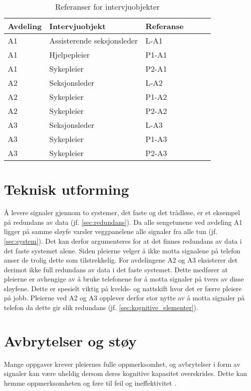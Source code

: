 \begin{table}[H]\centering
    \begin{tabular}{ |l|l|l|l|l|l| }
    \hline
    \textbf{Avdeling} & \textbf{Intervjuobjekt} & \textbf{Referanse} \\ \hline
       A1 & Assisterende seksjonsleder & L-A1 \\ \hline
       A1 & Hjelpepleier & P1-A1 \\ \hline
       A1 & Sykepleier & P2-A1 \\ \hline
       A2 & Seksjonsleder & L-A2 \\ \hline
       A2 & Sykepleier & P1-A2 \\ \hline
       A2 & Sykepleier & P2-A2 \\ \hline
       A3 & Seksjonsleder & L-A3 \\ \hline
       A3 & Sykepleier & P1-A3 \\ \hline
       A3 & Sykepleier & P2-A3 \\ \hline
    \end{tabular}
    \caption {Referanser for intervjuobjekter}
    \label{referanserintervju}
\end{table}

\section{Teknisk utforming}
Å levere signaler gjennom to systemer, det faste og det trådløse, er et eksempel på redundans av data (jf. \ref{sec:redundans}). Da alle sengetunene ved avdeling A1 ligger på samme sløyfe varsler veggpanelene alle signaler fra alle tun (jf. \ref{sec:system}). Det kan derfor argumenteres for at det finnes redundans av data i det faste systemet alene. Siden pleierne velger å ikke motta signalene på telefon anser de trolig dette som tilstrekkelig. For avdelingene A2 og A3 eksisterer det derimot ikke full redundans av data i det faste systemet. Dette medfører at pleierne er avhengige av å bruke telefonene for å motta signaler på tvers av disse sløyfene. Dette er spesielt viktig på kvelds- og nattskift hvor det er færre pleiere på jobb. Pleierne ved A2 og A3 opplever derfor stor nytte av å motta signaler på telefon da dette gir slik redundans (jf. \ref{sec:kognitive_elementer}).

\section{Avbrytelser og støy}
Mange oppgaver krever pleiernes fulle oppmerksomhet, og avbrytelser i form av signaler kan være uheldig dersom deres kognitive kapasitet overskrides. Dette kan hemme oppmerksomheten og føre til feil og ineffektivitet \citep{Ebright10, Parker00}.

